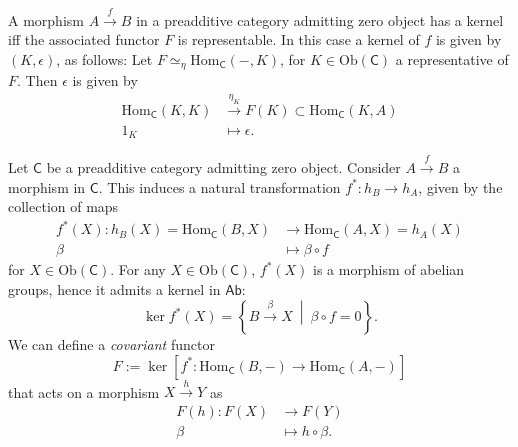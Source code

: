 \begin{prop}
	A morphism $A \xrightarrow{f} B$ in a preadditive category admitting zero object has a kernel iff the associated functor $F$ is representable.
	In this case a kernel of $f$ is given by $\left(K, \epsilon\right)$, as follows:
	Let $F \simeq_\eta \mathrm{Hom}_{\mathsf{C}} \left( -, K \right)$, for $K \in \mathrm{Ob} \left(\mathsf{C}\right)$ a representative of $F$.
	Then $\epsilon$ is given by
	\begin{align}
		\mathrm{Hom}_{\mathsf{C}} \left( K, K \right) &\xrightarrow{\eta_K} F(K) 
		\subset \mathrm{Hom}_{\mathsf{C}} \left( K, A \right)\\
		1_K &\mapsto \epsilon
	.\end{align} 
\end{prop} 

\begin{defn}
	Let $\mathsf{C}$ be a preadditive category admitting zero object.
	Consider $A \xrightarrow{f} B$ a morphism in $\mathsf{C}$.
	This induces a natural transformation
	$f^*\colon h_B \to h_A$, given by the collection of maps
	\begin{align}
		f^*(X): h_B(X) = \mathrm{Hom}_{\mathsf{C}} \left( B, X \right) &\to
		\mathrm{Hom}_{\mathsf{C}} \left( A, X \right) = h_A(X) \\
		\beta &\mapsto \beta \circ f
	\end{align} 
	for $X \in \mathrm{Ob} \left(\mathsf{C}\right)$.
	For any $X \in \mathrm{Ob} \left(\mathsf{C}\right)$, $f^*(X)$ is a morphism of abelian groups, hence it admits a kernel in $\mathsf{Ab}$:
	\begin{equation}
		\ker f^*(X) = \left\{ B \xrightarrow{\beta} X \ \middle|\ \beta \circ f = 0 \right\}
	.\end{equation} 
	We can define a {\em covariant} functor
	\begin{equation}
	F := \ker \left[ f^*: \mathrm{Hom}_{\mathsf{C}} \left( B, - \right) \to \mathrm{Hom}_{\mathsf{C}} \left( A, - \right) \right]
	\end{equation} 
	that acts on a morphism $X \xrightarrow{h} Y$ as
	\begin{align}
		F(h): F(X) &\to F(Y) \\
		\beta &\mapsto h \circ \beta
	.\end{align} 
\end{defn}

